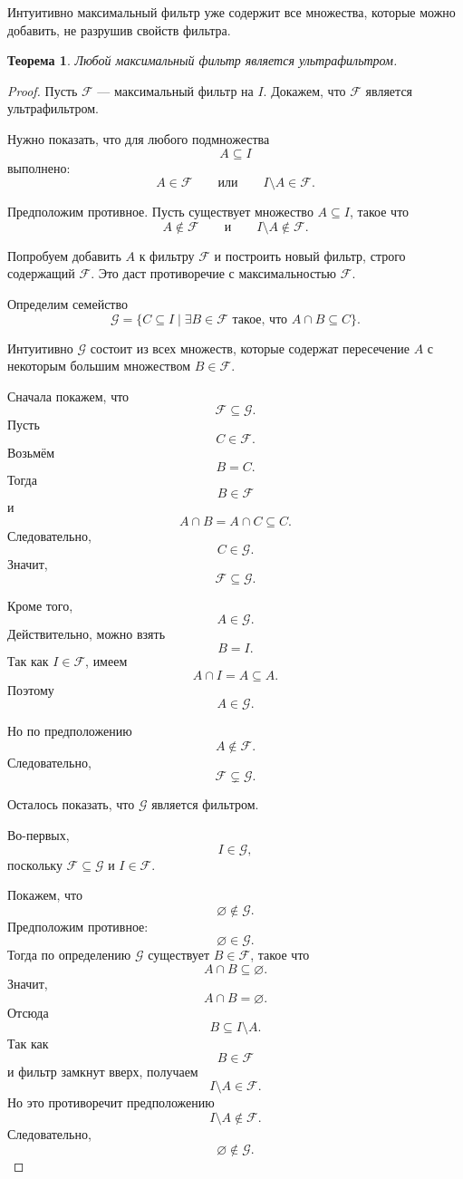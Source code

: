 \documentclass[12pt,a4paper,oneside,openany]{book}
\theoremstyle{definition}
\theoremstyle{plain}
\newtheorem{theorem}{Теорема}[chapter]
\theoremstyle{remark}
\begin{document}
Интуитивно максимальный фильтр уже содержит все множества, которые можно добавить, не разрушив свойств фильтра.

\begin{theorem}
Любой максимальный фильтр является ультрафильтром.
\end{theorem}

\begin{proof}
Пусть $\mathcal F$ — максимальный фильтр на $I$. Докажем, что $\mathcal F$ является ультрафильтром.

Нужно показать, что для любого подмножества
\[
A\subseteq I
\]
выполнено:
\[
A\in\mathcal F
\qquad
\text{или}
\qquad
I\setminus A\in\mathcal F.
\]

Предположим противное. Пусть существует множество $A\subseteq I$, такое что
\[
A\notin\mathcal F
\qquad
\text{и}
\qquad
I\setminus A\notin\mathcal F.
\]

Попробуем добавить $A$ к фильтру $\mathcal F$ и построить новый фильтр, строго содержащий $\mathcal F$. Это даст противоречие с максимальностью $\mathcal F$.

Определим семейство
\[
\mathcal G
=
\{C\subseteq I\mid \exists B\in\mathcal F \text{ такое, что } A\cap B\subseteq C\}.
\]

Интуитивно $\mathcal G$ состоит из всех множеств, которые содержат пересечение $A$ с некоторым большим множеством $B\in\mathcal F$.

Сначала покажем, что
\[
\mathcal F\subseteq\mathcal G.
\]
Пусть
\[
C\in\mathcal F.
\]
Возьмём
\[
B=C.
\]
Тогда
\[
B\in\mathcal F
\]
и
\[
A\cap B=A\cap C\subseteq C.
\]
Следовательно,
\[
C\in\mathcal G.
\]
Значит,
\[
\mathcal F\subseteq\mathcal G.
\]

Кроме того,
\[
A\in\mathcal G.
\]
Действительно, можно взять
\[
B=I.
\]
Так как $I\in\mathcal F$, имеем
\[
A\cap I=A\subseteq A.
\]
Поэтому
\[
A\in\mathcal G.
\]

Но по предположению
\[
A\notin\mathcal F.
\]
Следовательно,
\[
\mathcal F\subsetneq\mathcal G.
\]

Осталось показать, что $\mathcal G$ является фильтром.

Во-первых,
\[
I\in\mathcal G,
\]
поскольку $\mathcal F\subseteq\mathcal G$ и $I\in\mathcal F$.

Покажем, что
\[
\varnothing\notin\mathcal G.
\]
Предположим противное:
\[
\varnothing\in\mathcal G.
\]
Тогда по определению $\mathcal G$ существует $B\in\mathcal F$, такое что
\[
A\cap B\subseteq\varnothing.
\]
Значит,
\[
A\cap B=\varnothing.
\]
Отсюда
\[
B\subseteq I\setminus A.
\]
Так как
\[
B\in\mathcal F
\]
и фильтр замкнут вверх, получаем
\[
I\setminus A\in\mathcal F.
\]
Но это противоречит предположению
\[
I\setminus A\notin\mathcal F.
\]
Следовательно,
\[
\varnothing\notin\mathcal G.
\]


\end{proof}
\end{document}
